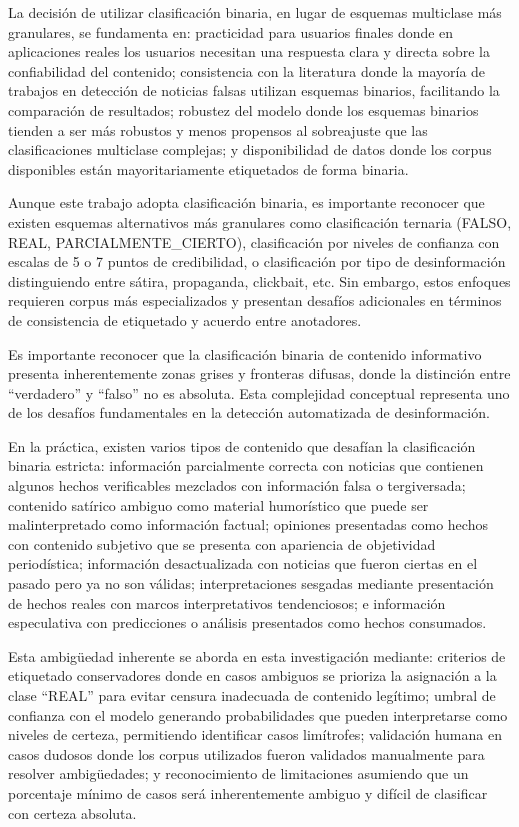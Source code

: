 La decisión de utilizar clasificación binaria, en lugar de esquemas multiclase más granulares, se fundamenta en: practicidad para usuarios finales donde en aplicaciones reales los usuarios necesitan una respuesta clara y directa sobre la confiabilidad del contenido; consistencia con la literatura donde la mayoría de trabajos en detección de noticias falsas utilizan esquemas binarios, facilitando la comparación de resultados; robustez del modelo donde los esquemas binarios tienden a ser más robustos y menos propensos al sobreajuste que las clasificaciones multiclase complejas; y disponibilidad de datos donde los corpus disponibles están mayoritariamente etiquetados de forma binaria.

Aunque este trabajo adopta clasificación binaria, es importante reconocer que existen esquemas alternativos más granulares como clasificación ternaria (FALSO, REAL, PARCIALMENTE\_CIERTO), clasificación por niveles de confianza con escalas de 5 o 7 puntos de credibilidad, o clasificación por tipo de desinformación distinguiendo entre sátira, propaganda, clickbait, etc. Sin embargo, estos enfoques requieren corpus más especializados y presentan desafíos adicionales en términos de consistencia de etiquetado y acuerdo entre anotadores.

Es importante reconocer que la clasificación binaria de contenido informativo presenta inherentemente zonas grises y fronteras difusas, donde la distinción entre ``verdadero'' y ``falso'' no es absoluta. Esta complejidad conceptual representa uno de los desafíos fundamentales en la detección automatizada de desinformación.

En la práctica, existen varios tipos de contenido que desafían la clasificación binaria estricta: información parcialmente correcta con noticias que contienen algunos hechos verificables mezclados con información falsa o tergiversada; contenido satírico ambiguo como material humorístico que puede ser malinterpretado como información factual; opiniones presentadas como hechos con contenido subjetivo que se presenta con apariencia de objetividad periodística; información desactualizada con noticias que fueron ciertas en el pasado pero ya no son válidas; interpretaciones sesgadas mediante presentación de hechos reales con marcos interpretativos tendenciosos; e información especulativa con predicciones o análisis presentados como hechos consumados.

Esta ambigüedad inherente se aborda en esta investigación mediante: criterios de etiquetado conservadores donde en casos ambiguos se prioriza la asignación a la clase ``REAL'' para evitar censura inadecuada de contenido legítimo; umbral de confianza con el modelo generando probabilidades que pueden interpretarse como niveles de certeza, permitiendo identificar casos limítrofes; validación humana en casos dudosos donde los corpus utilizados fueron validados manualmente para resolver ambigüedades; y reconocimiento de limitaciones asumiendo que un porcentaje mínimo de casos será inherentemente ambiguo y difícil de clasificar con certeza absoluta.

